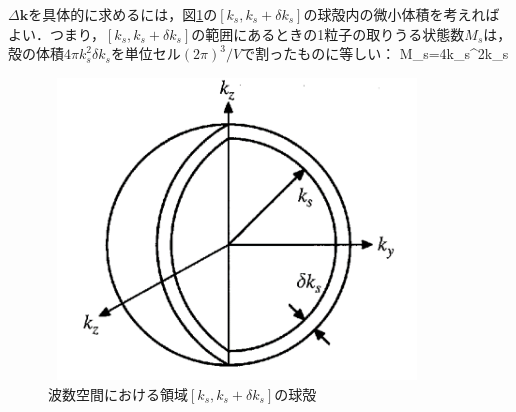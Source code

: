 $\Delta\bm{k}$を具体的に求めるには，図\ref{g5}の$[k_s,k_s+\delta k_s]$の球殻内の微小体積を考えればよい．つまり，$[k_s,k_s+\delta　k_s]$の範囲にあるときの1粒子の取りうる状態数$M_s$は，殻の体積$4\pi k_s^2\delta k_s$を単位セル$(2\pi)^3/V$で割ったものに等しい：
\be\label{d3}
M_s=4\pi k_s^2\delta k_s
\ee


\begin{figure}[H]
 \centering
\includegraphics[width=10cm,height=8cm]{file/basic_st/fig/bo4.png}
  \caption{波数空間における領域$[k_s,k_s+\delta k_s]$の球殻}
  \label{g5}
\end{figure}





